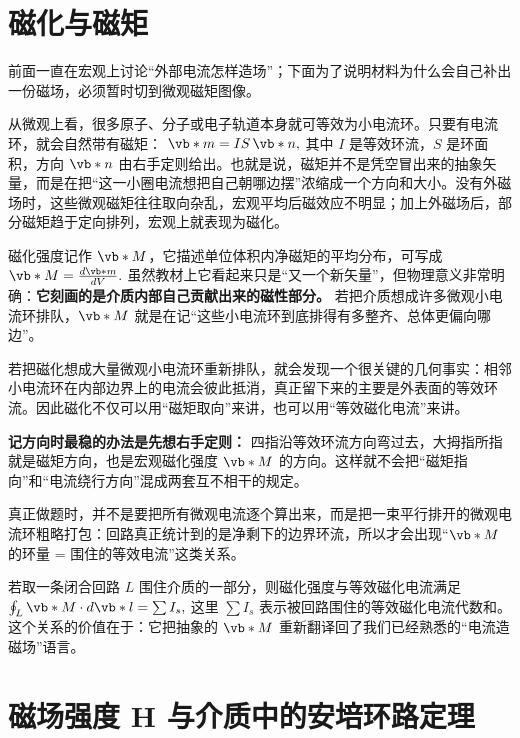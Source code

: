 \documentclass[lang=cn,11pt]{elegantbook}
\newcommand{\bridge}[1]{\begin{note}#1\end{note}}
\begin{document}
\section{磁化与磁矩}

前面一直在宏观上讨论“外部电流怎样造场”；下面为了说明材料为什么会自己补出一份磁场，必须暂时切到微观磁矩图像。

从微观上看，很多原子、分子或电子轨道本身就可等效为小电流环。只要有电流环，就会自然带有磁矩：
 \(\vb*{m}=IS\,\vb*{n},\) 
其中 \(I\) 是等效环流，\(S\) 是环面积，方向 \(\vb*{n}\) 由右手定则给出。也就是说，磁矩并不是凭空冒出来的抽象矢量，而是在把“这一小圈电流想把自己朝哪边摆”浓缩成一个方向和大小。没有外磁场时，这些微观磁矩往往取向杂乱，宏观平均后磁效应不明显；加上外磁场后，部分磁矩趋于定向排列，宏观上就表现为磁化。

磁化强度记作 \(\vb*{M}\)，它描述单位体积内净磁矩的平均分布，可写成
 \(\vb*{M}=\frac{d\vb*{m}}{dV}.\) 
虽然教材上它看起来只是“又一个新矢量”，但物理意义非常明确：\textbf{它刻画的是介质内部自己贡献出来的磁性部分。} 若把介质想成许多微观小电流环排队，\(\vb*{M}\) 就是在记“这些小电流环到底排得有多整齐、总体更偏向哪边”。

\bridge{若把磁化想成大量微观小电流环重新排队，就会发现一个很关键的几何事实：相邻小电流环在内部边界上的电流会彼此抵消，真正留下来的主要是外表面的等效环流。因此磁化不仅可以用“磁矩取向”来讲，也可以用“等效磁化电流”来讲。}

\begin{note}
\textbf{记方向时最稳的办法是先想右手定则：} 四指沿等效环流方向弯过去，大拇指所指就是磁矩方向，也是宏观磁化强度 \(\vb*{M}\) 的方向。这样就不会把“磁矩指向”和“电流绕行方向”混成两套互不相干的规定。
\end{note}

真正做题时，并不是要把所有微观电流逐个算出来，而是把一束平行排开的微观电流环粗略打包：回路真正统计到的是净剩下的边界环流，所以才会出现“\(\vb*{M}\) 的环量 = 围住的等效电流”这类关系。

若取一条闭合回路 \(L\) 围住介质的一部分，则磁化强度与等效磁化电流满足
 \(\oint_L \vb*{M}\cdot d\vb*{l}=\sum I_s,\) 
这里 \(\sum I_s\) 表示被回路围住的等效磁化电流代数和。这个关系的价值在于：它把抽象的 \(\vb*{M}\) 重新翻译回了我们已经熟悉的“电流造磁场”语言。

\section{磁场强度 H 与介质中的安培环路定理}
\end{document}
